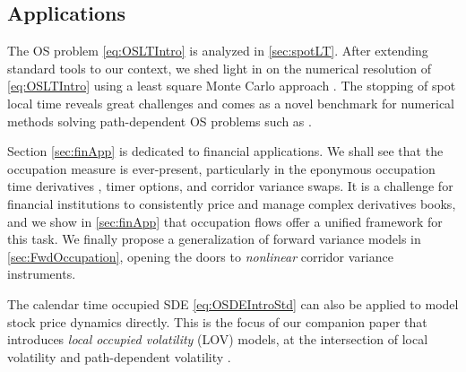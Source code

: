 \documentclass[11pt]{article}
\theoremstyle{plain}
\theoremstyle{definition}
\begin{document}
\subsection{Applications}  


The  OS problem \eqref{eq:OSLTIntro} 
is  analyzed in \cref{sec:spotLT}. After extending standard tools  to our context, we shed light in  on  the numerical resolution of \eqref{eq:OSLTIntro} using 
a least square Monte Carlo approach  \cite{LS}.  
The stopping of spot local time  reveals great challenges  and comes as a novel  benchmark for numerical methods solving  path-dependent OS  problems such as \cite{Bayer,bayraktar,Becker}. 


Section \ref{sec:finApp} is dedicated to  financial applications. We shall see that the occupation measure is ever-present, particularly  in the eponymous occupation time derivatives \cite{Detemple,Hugonnier,ChesneyJeanblancYor}, timer options, and corridor variance swaps.  
It is a challenge for financial institutions to consistently price and manage complex derivatives books, and  we show in  \ref{sec:finApp} that occupation flows offer a unified framework for this task.  We finally propose a generalization of forward variance models in \cref{sec:FwdOccupation},  opening the doors to \textit{nonlinear} corridor variance instruments.


The calendar time occupied SDE \eqref{eq:OSDEIntroStd} can also be applied to model stock price dynamics directly. This is the focus of our companion paper \cite{TissotLOV} that introduces  \textit{local occupied volatility} (LOV) models, at the intersection of  local volatility \cite{DupireLV} and  path-dependent volatility  \cite{Guyon2014,GuyonSlides,GuyonLekeufack,HobsonRogers}.

\end{document}
